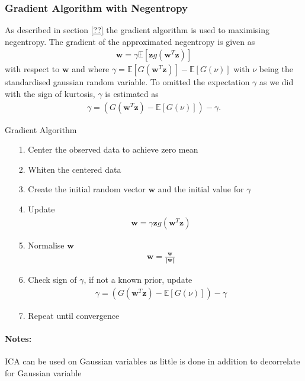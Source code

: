 \subsubsection*{Gradient Algorithm with Negentropy}
As described in section \ref{??} the gradient algorithm is used to maximising negentropy. The gradient of the approximated negentropy is given as
\begin{align*}
\mathbf{w} = \gamma \mathbb{E}[\mathbf{z} g(\mathbf{w}^T \mathbf{z})]
\end{align*}
with respect to $\mathbf{w}$ and where $\gamma = \mathbb{E}[G(\mathbf{w}^T \mathbf{z})] - \mathbb{E}[G(\nu)]$ with $\nu$ being the standardised gaussian random variable. To omitted the expectation $\gamma$ as we did with the sign of kurtosis, $\gamma$ is estimated as
\begin{align*}
\gamma = (G(\mathbf{w}^T \mathbf{z}) - \mathbb{E}[G(\nu)]) - \gamma.
\end{align*}



\begin{algorithm}[H]
\caption{Gradient Algorithm}
\begin{itemize}
\item[1.] Center the observed data to achieve zero mean
\item[2.] Whiten the centered data
\item[3.] Create the initial random vector $\mathbf{w}$ and the initial value for $\gamma$
\item[4.] Update
\begin{align*}
\mathbf{w} = \gamma \mathbf{z} g(\mathbf{w}^T \mathbf{z})
\end{align*}
\item[5.] Normalise $\mathbf{w}$
\begin{align*}
\mathbf{w} = \frac{\mathbf{w}}{\Vert \mathbf{w} \Vert}
\end{align*}
\item[6.] Check sign of $\gamma$, if not a known prior, update
\begin{align*}
\gamma = (G(\mathbf{w}^T \mathbf{z}) - \mathbb{E}[G(\nu)]) - \gamma
\end{align*}
\item[7.] Repeat until convergence
\end{itemize}
\end{algorithm}

\paragraph{Notes:}
ICA can be used on Gaussian variables as little is done in addition to decorrelate for Gaussian variable

